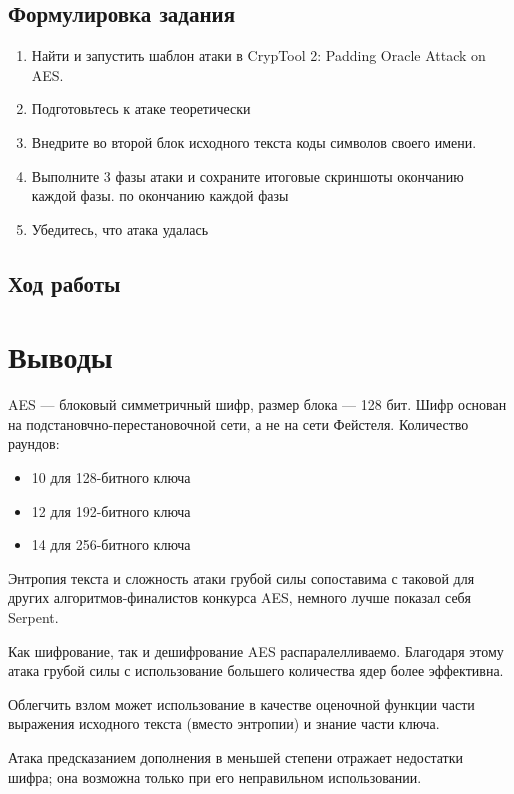 \documentclass[a4paper, 14pt]{extarticle}
\begin{document}
\subsection{Формулировка задания}
\begin{enumerate}
    \item Найти и запустить шаблон атаки в CrypTool 2: Padding Oracle Attack on AES.\@
    \item Подготовьтесь к атаке теоретически
    \item  Внедрите во второй блок исходного текста коды символов своего имени.
    \item  Выполните 3 фазы атаки и сохраните итоговые скриншоты окончанию каждой фазы.  по окончанию каждой фазы
    \item Убедитесь, что атака удалась
\end{enumerate}

\subsection{Ход работы}
\lipsum[1] %

\newpage
\section*{Выводы}
AES --- блоковый симметричный шифр, размер блока --- 128 бит. Шифр основан на подстановчно-перестановочной сети, а не на сети Фейстеля. Количество раундов:
\begin{itemize}
    \item 10 для 128-битного ключа
    \item 12 для 192-битного ключа
    \item 14 для 256-битного ключа\\
\end{itemize}

Энтропия текста и сложность атаки грубой силы сопоставима с таковой для других алгоритмов-финалистов конкурса AES, немного лучше показал себя Serpent.

Как шифрование, так и дешифрование AES распаралелливаемо. Благодаря этому атака грубой силы с использование большего количества ядер более эффективна.

Облегчить взлом может использование в качестве оценочной функции части выражения исходного текста (вместо энтропии) и знание части ключа.

Атака предсказанием дополнения в меньшей степени отражает недостатки шифра; она возможна только при его неправильном использовании.
\end{document}
